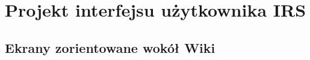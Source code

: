 \documentclass{scrreprt}
\begin{document}
\chapter{Projekt interfejsu użytkownika IRS}

\section{Ekrany zorientowane wokół Wiki}
\begin{center}
\end{center}
\end{document}
